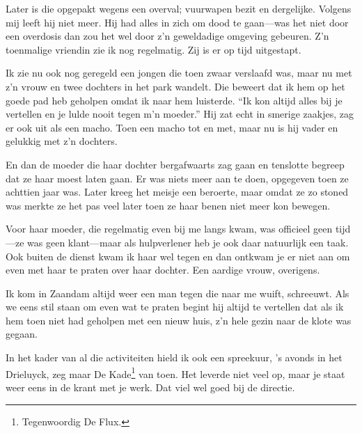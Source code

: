 \documentclass[10pt,twoside, openright]{memoir}
\begin{document}
Later is die opgepakt wegens een overval; vuurwapen bezit en dergelijke. Volgens mij leeft hij niet meer. Hij had alles in zich om dood te gaan---was het niet door een overdosis dan zou het wel door z’n geweldadige omgeving gebeuren. Z’n toenmalige vriendin zie ik nog regelmatig. Zij is er op tijd uitgestapt.

Ik zie nu ook nog geregeld een jongen die toen zwaar verslaafd was, maar nu met z’n vrouw en twee dochters in het park wandelt. Die beweert dat ik hem op het goede pad heb geholpen omdat ik naar hem luisterde. ``Ik kon altijd alles bij je vertellen en je lulde nooit tegen m’n moeder.'' Hij zat echt in smerige zaakjes, zag er ook uit als een macho. Toen een macho tot en met, maar nu is hij vader en gelukkig met z’n dochters. 

En dan de moeder die haar dochter bergafwaarts zag gaan en tenslotte begreep dat ze haar moest laten gaan. Er was niets meer aan te doen, opgegeven toen ze achttien jaar was. Later kreeg het meisje een beroerte, maar omdat ze zo stoned was merkte ze het pas veel later toen ze haar benen niet meer kon bewegen. 

Voor haar moeder, die regelmatig even bij me langs kwam, was officieel geen tijd---ze was geen klant---maar als hulpverlener heb je ook daar natuurlijk een taak. Ook buiten de dienst kwam ik haar wel tegen en dan ontkwam je er niet aan om even met haar te praten over haar dochter. Een aardige vrouw, overigens.

Ik kom in Zaandam altijd weer een man tegen die naar me wuift, schreeuwt. Als we eens stil staan om even wat te praten begint hij altijd te vertellen dat als ik hem toen niet had geholpen met een nieuw huis, z’n hele gezin naar de klote was gegaan.

In het kader van al die activiteiten hield ik ook een spreekuur, 's avonds in het Drieluyck, zeg maar De Kade\footnote{Tegenwoordig De Flux.} van toen. Het leverde niet veel op, maar je staat weer eens in de krant met je werk. Dat viel wel goed bij de directie. 
\end{document}
